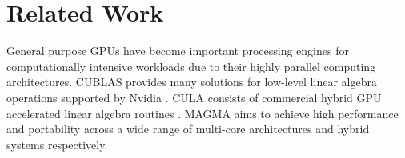 \section{Related Work}
\label{sec:related}
General purpose GPUs have become important processing engines for computationally intensive workloads due to their highly parallel computing architectures.
CUBLAS provides many solutions for low-level linear algebra operations supported by Nvidia \cite{cublas}. 
CULA consists of commercial hybrid GPU accelerated linear algebra routines \cite{cula}.
MAGMA aims to achieve high performance and portability across a wide range of multi-core architectures and hybrid systems respectively\cite{magma}.


